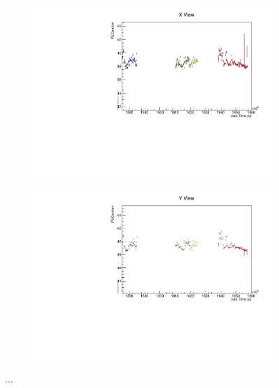 \documentclass[12pt,a4paper]{article}
\begin{document}
\begin{figure}[h!]
\begin{subfigure}{0.5\textwidth}
  \end{subfigure}
  \begin{subfigure}{0.5\textwidth}
    \includegraphics[width=\linewidth]{driftsec_tb/pecorrcm_time_x.pdf}
  \end{subfigure}
  \begin{subfigure}{0.5\textwidth}
    \includegraphics[width=\linewidth]{driftsec_tb/pecorrcm_time_y.pdf}
  \end{subfigure}
  \caption{...}
  \label{figAbsCalibDrift1}
\end{figure}
\end{document}
